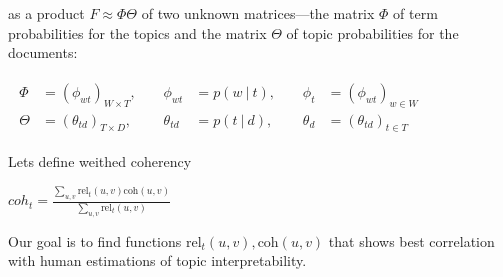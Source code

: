 \documentclass{article}
\begin{document}
as a product $F \approx \Phi \Theta $ of two unknown matrices—the matrix $\Phi$ of term probabilities for the topics and the matrix $\Theta$ of topic probabilities for the documents:

$\begin{aligned} \begin{array}{rlrlrl} \Phi &{}= (\phi _{wt})_{W{\times }T},\;\;\;\; &{} \phi _{wt} &{}= p(w\ {\vert }\ t),\;\;\;\; &{} \phi _t &{}= (\phi _{wt})_{w\in W} \\ \Theta &{}= (\theta _{td})_{T{\times }D},\;\;\;\; &{} \theta _{td} &{}= p(t\ {\vert }\ d),\;\;\;\; &{} \theta _d &{}= (\theta _{td})_{t\in T}\end{array} \end{aligned}$

Lets define weithed coherency

$coh_t = \frac {\sum_{u, v} \text{rel}_t(u, v) \text{coh}(u, v)} {\sum_{u, v}  \text{rel}_t(u, v)}$

Our goal is to find functions $\text{rel}_t(u, v), \text{coh}(u, v)$ that shows best correlation with human estimations of topic interpretability.  






\end{document}
